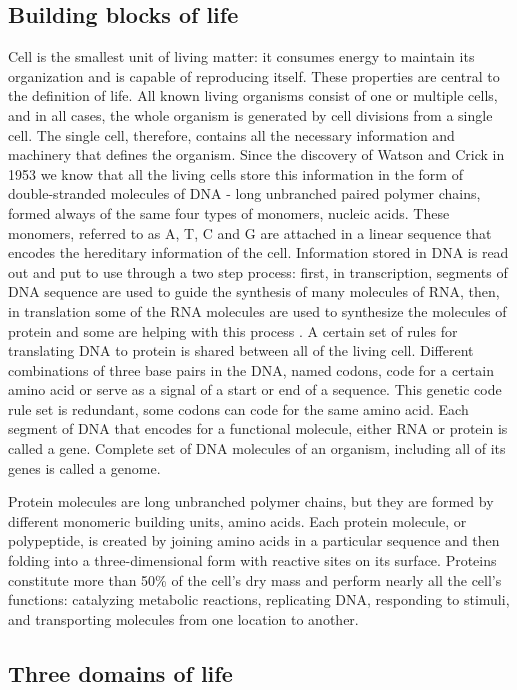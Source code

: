 \documentclass[11pt, a4paper,oneside]{report}
\begin{document}
\subsection{Building blocks of life}
Cell is the smallest unit of living matter: it consumes energy to maintain its organization and is capable of reproducing itself. These properties are central to the definition of life. All known living organisms consist of one or multiple cells, and in all cases, the whole organism is generated by cell divisions from a single cell. The single cell, therefore, contains all the necessary information and machinery that defines the organism.  Since the discovery of Watson and Crick in 1953\cite{Watson1974} we know that all the living cells store this information in the form of double-stranded molecules of DNA - long unbranched paired polymer chains, formed always of the same four types of monomers, nucleic acids. These monomers, referred to as A, T, C and G are attached  in a linear sequence that encodes the hereditary information of the cell. Information stored in DNA is read out and put to use through a two step process: first, in transcription, segments of DNA sequence are used to guide the synthesis of many molecules of RNA, then, in translation some of the RNA molecules are used to synthesize the molecules of protein and some are helping with this process
\cite{rRNA}. A certain set of rules for translating DNA to protein is shared between all of the living cell.  Different combinations of three base pairs in the DNA, named codons, code for a certain amino acid or serve as a signal of a start or end of a sequence.  This genetic code rule set is redundant, some codons can code for the same amino acid\cite{Turanov2009}. Each segment of DNA that encodes for a functional molecule, either RNA or protein is called a gene\cite{Gerstein2007}.  Complete set of DNA molecules of an organism, including all of its genes is called a genome.  
 
Protein molecules are long unbranched polymer chains, but they are formed by different monomeric building units, amino acids. Each protein molecule, or polypeptide, is created by joining amino acids in a particular sequence and then folding into a three-dimensional form with reactive sites on its surface. Proteins constitute more than 50\%  of the cell's dry mass\cite{Alberts2007} and perform nearly all the cell’s functions: catalyzing metabolic reactions, replicating DNA, responding to stimuli, and transporting molecules from one location to another.

\subsection{Three domains of life}
\end{document}
